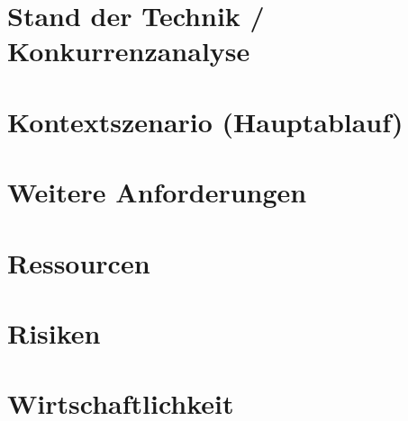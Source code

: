 \documentclass[10pt]{article}
\begin{document}
\section{Stand der Technik / Konkurrenzanalyse}

\section{Kontextszenario (Hauptablauf)}

\section{Weitere Anforderungen}

\section{Ressourcen}

\section{Risiken}

\section{Wirtschaftlichkeit}
\end{document}
